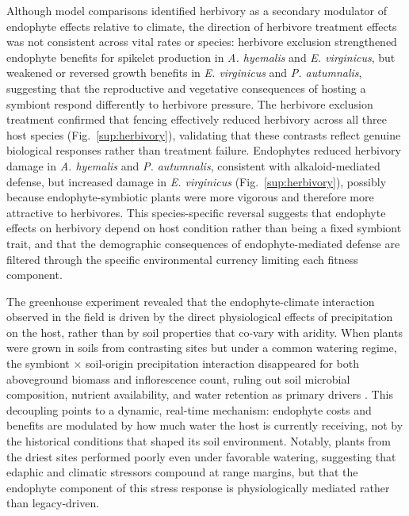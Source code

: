 \documentclass[12pt]{article}\usepackage[]{graphicx}\usepackage[dvipsnames]{xcolor}
\begin{document}
Although model comparisons identified herbivory as a secondary modulator of endophyte effects relative to climate, the direction of herbivore treatment effects was not 
consistent across vital rates or species: herbivore exclusion strengthened endophyte benefits for spikelet production in \textit{A. hyemalis} and \textit{E. virginicus}, 
but weakened or reversed growth benefits in \textit{E. virginicus} and \textit{P. autumnalis}, suggesting that the reproductive and vegetative consequences of hosting a symbiont 
respond differently to herbivore pressure. 
The herbivore exclusion treatment confirmed that fencing effectively reduced herbivory across all three host species 
(Fig.~\ref{sup:herbivory}), validating that these contrasts reflect genuine biological responses rather than treatment failure. 
Endophytes reduced herbivory damage in \textit{A. hyemalis} and \textit{P. autumnalis}, consistent with alkaloid-mediated defense, but increased damage in \textit{E. virginicus} (Fig.~\ref{sup:herbivory}), possibly because endophyte-symbiotic plants were more vigorous and therefore more 
attractive to herbivores. 
This species-specific reversal suggests that endophyte effects on herbivory depend on host condition rather than being a fixed symbiont trait, and that the demographic consequences of endophyte-mediated defense are filtered through the specific environmental currency limiting each fitness component.

The greenhouse experiment revealed that the endophyte-climate interaction observed in the field is driven by the direct physiological effects of precipitation on the host, 
rather than by soil properties that co-vary with aridity. When plants were grown in soils from contrasting sites but under a common watering regime, the symbiont $\times$ soil-origin precipitation interaction disappeared for both aboveground biomass and inflorescence count, ruling out soil microbial composition, nutrient availability, and water retention as primary drivers \citep{van2013plant}. 
This decoupling points to a dynamic, real-time mechanism: endophyte costs and benefits are modulated by how much water the host is currently receiving, not by the historical conditions that shaped its soil environment. 
Notably, plants from the driest sites performed poorly even under favorable watering, suggesting that edaphic and climatic stressors compound at range 
margins, but that the endophyte component of this stress response is physiologically mediated rather than legacy-driven.
\end{document}
